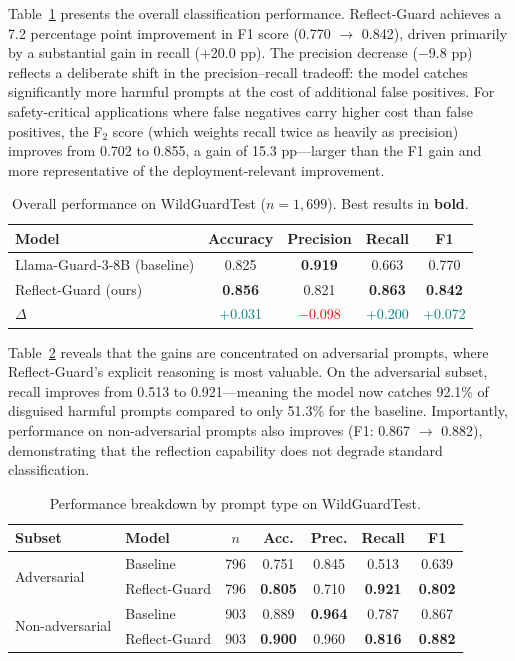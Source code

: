 \documentclass[Superintelligence,article,submit,pdftex,moreauthors]{Definitions/mdpi}
\begin{document}
Table~\ref{tab:wildguard_main} presents the overall classification performance. Reflect-Guard achieves a 7.2 percentage point improvement in F1 score (0.770 $\to$ 0.842), driven primarily by a substantial gain in recall (+20.0 pp). The precision decrease ($-$9.8 pp) reflects a deliberate shift in the precision--recall tradeoff: the model catches significantly more harmful prompts at the cost of additional false positives. For safety-critical applications where false negatives carry higher cost than false positives, the F$_2$ score (which weights recall twice as heavily as precision) improves from 0.702 to 0.855, a gain of 15.3 pp---larger than the F1 gain and more representative of the deployment-relevant improvement.

\begin{table}[H]
  \caption{Overall performance on WildGuardTest ($n = 1{,}699$). Best results in \textbf{bold}.\label{tab:wildguard_main}}
  \centering
  \begin{tabular}{lcccc}
    \toprule
    Model & Accuracy & Precision & Recall & F1 \\
    \midrule
    Llama-Guard-3-8B (baseline) & 0.825 & \textbf{0.919} & 0.663 & 0.770 \\
    Reflect-Guard (ours) & \textbf{0.856} & 0.821 & \textbf{0.863} & \textbf{0.842} \\
    \midrule
    $\Delta$ & \textcolor{teal}{+0.031} & \textcolor{red}{$-$0.098} & \textcolor{teal}{+0.200} & \textcolor{teal}{+0.072} \\
    \bottomrule
  \end{tabular}
\end{table}

Table~\ref{tab:wildguard_subset} reveals that the gains are concentrated on adversarial prompts, where Reflect-Guard's explicit reasoning is most valuable. On the adversarial subset, recall improves from 0.513 to 0.921---meaning the model now catches 92.1\% of disguised harmful prompts compared to only 51.3\% for the baseline. Importantly, performance on non-adversarial prompts also improves (F1: 0.867 $\to$ 0.882), demonstrating that the reflection capability does not degrade standard classification.

\begin{table}[H]
  \caption{Performance breakdown by prompt type on WildGuardTest.\label{tab:wildguard_subset}}
  \centering
  \begin{tabular}{llccccc}
    \toprule
    Subset & Model & $n$ & Acc. & Prec. & Recall & F1 \\
    \midrule
    \multirow{2}{*}{Adversarial}
    & Baseline & 796 & 0.751 & 0.845 & 0.513 & 0.639 \\
    & Reflect-Guard & 796 & \textbf{0.805} & 0.710 & \textbf{0.921} & \textbf{0.802} \\
    \midrule
    \multirow{2}{*}{Non-adversarial}
    & Baseline & 903 & 0.889 & \textbf{0.964} & 0.787 & 0.867 \\
    & Reflect-Guard & 903 & \textbf{0.900} & 0.960 & \textbf{0.816} & \textbf{0.882} \\
    \bottomrule
  \end{tabular}
\end{table}
\end{document}
